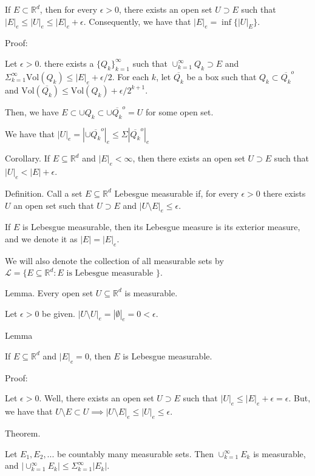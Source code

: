 \documentclass[10pt]{article}
\newcommand{\vol}{\text{Vol}}
\begin{document}
If $E \subset \mathbb{R}^d$, then for every $\epsilon > 0$, there exists an open set $U \supset E$ such that $|E|_e \leq |U|_e \leq |E|_e + \epsilon$. Consequently, we have that $|E|_e = \inf \{ |U|_E\}$.

Proof:

Let $\epsilon > 0$. there exists a $\{ Q_k \}_{k=1}^\infty$ such that $\cup_{k=1}^\infty Q_k \supset E$ and  $\Sigma_{k=1}^\infty\vol(Q_k) \leq |E|_e + \epsilon/2$. For each $k$, let $\overline{Q_k}$ be a box such that $Q_k \subset \overline{Q_k}^o$ and $\vol(\overline{Q_k}) \leq \vol(Q_k) + \epsilon/2^{k+1}$.

Then, we have $E \subset \cup Q_k \subset \cup  \overline{Q_k}^o = U$ for some open set. 

We have that $|U|_e = |\cup\overline{Q_k}^o|_e \leq \Sigma |\overline{Q_k}^o|_e$

Corollary. If $E \subseteq \mathbb{R}^d$ and $|E|_e < \infty$, then there exists an open set $U \supset E$ such that $|U|_e < |E| + \epsilon$.

Definition. Call a set $E \subseteq \mathbb{R}^d$ Lebesgue measurable if, for every $\epsilon > 0$ there exists $U$ an open set such that $U \supset E$ and $|U \setminus E|_e \leq \epsilon$. 

If $E$ is Lebesgue measurable, then its Lebesgue measure is its exterior measure, and we denote it as $|E| = |E|_e$.

We will also denote the collection of all measurable sets by $\mathcal{L} = \{ E \subseteq \mathbb{R}^d : E \text{ is Lebesgue measurable }\}$.

Lemma.
Every open set $U \subseteq \mathbb{R}^d$ is measurable.

Let $\epsilon > 0$ be given. $|U \setminus U|_e = | \emptyset|_e = 0 < \epsilon$.

Lemma

If $E \subseteq \mathbb{R}^d$ and $|E|_e = 0$, then $E$ is Lebesgue measurable.

Proof:

Let $\epsilon > 0$. Well, there exists an open set $U \supset E$ such that $|U|_e \leq |E|_e + \epsilon = \epsilon$. But, we have that $U \setminus E \subset U \implies |U \setminus E|_e \leq |U|_e \leq \epsilon$.

Theorem.

Let $E_1, E_2, ...$ be countably many measurable sets. Then $\cup_{k=1}^\infty E_k$ is measurable, and $|\cup_{k=1}^\infty E_k| \leq \Sigma_{k=1}^\infty |E_k|$.
\end{document}
